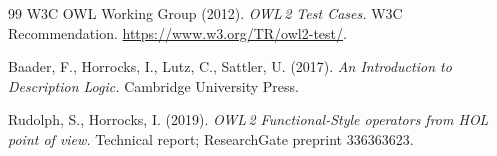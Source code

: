 \documentclass[11pt, a4paper]{article}
\theoremstyle{definition}
\theoremstyle{remark}
\begin{document}
\begin{thebibliography}{99}
W3C OWL Working Group (2012).
\newblock \emph{OWL\,2 Test Cases.}
\newblock W3C Recommendation.
\newblock \url{https://www.w3.org/TR/owl2-test/}.

Baader, F., Horrocks, I., Lutz, C., Sattler, U. (2017).
\newblock \emph{An Introduction to Description Logic.}
\newblock Cambridge University Press.

Rudolph, S., Horrocks, I. (2019).
\newblock \emph{OWL\,2 Functional-Style operators from HOL point of view.}
\newblock Technical report; ResearchGate preprint 336363623.

\end{thebibliography}
\end{document}
